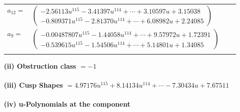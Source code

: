 \documentclass[1p]{elsarticle_modified}
\theoremstyle{definition}
\begin{document}
\begin{tabular}{m{7pt} m{180pt} m{7pt} m{180pt} }
\flushright $a_{12}=$&$\begin{pmatrix}-2.56113 u^{115}-3.41397 u^{114}+\cdots+3.10597 u+3.15038\\-0.809371 u^{115}-2.81370 u^{114}+\cdots+6.08982 u+2.24085\end{pmatrix}$ \\
\flushright $a_{9}=$&$\begin{pmatrix}-0.00487807 u^{115}-1.44058 u^{114}+\cdots+9.57972 u+1.72391\\-0.539615 u^{115}-1.54506 u^{114}+\cdots+5.14801 u+1.34085\end{pmatrix}$\\&\end{tabular}
\flushleft \textbf{(ii) Obstruction class $= -1$}\\~\\
\flushleft \textbf{(iii) Cusp Shapes $= 4.97176 u^{115}+8.14134 u^{114}+\cdots-7.30434 u+7.67511$}\\~\\
\newpage\renewcommand{\arraystretch}{1}
\flushleft \textbf{(iv) u-Polynomials at the component}\newline \\
\end{document}

